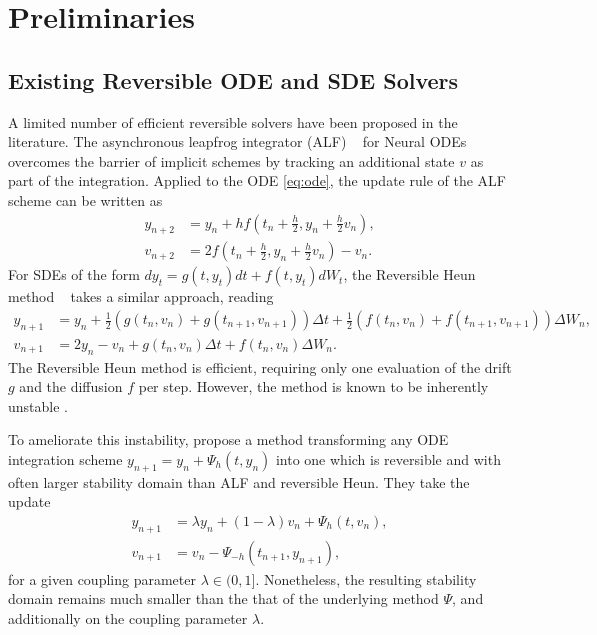 \documentclass{article}
\theoremstyle{definition}
\theoremstyle{remark}
\begin{document}
\section{Preliminaries}
\subsection{Existing Reversible ODE and SDE Solvers}
A limited number of efficient reversible solvers have been proposed in the literature. The asynchronous leapfrog integrator (ALF) ~\citep{zhuang2021mali} for Neural ODEs overcomes the barrier of implicit schemes by tracking an additional state $v$ as part of the integration. Applied to the ODE \eqref{eq:ode}, the update rule of the ALF scheme can be written as
\begin{align*}
    y_{n+2} &= y_n + h f\left(t_n + \frac{h}{2}, y_n + \frac{h}{2} v_n\right),\\
    v_{n+2} &=2f\left(t_n + \frac{h}{2}, y_n + \frac{h}{2} v_n\right) - v_n.
\end{align*}
For SDEs of the form $dy_t = g(t,y_t)dt + f(t,y_t)dW_t$, the Reversible Heun method ~\citep{kidger2021efficient} takes a similar approach, reading
\begin{align*}
    y_{n+1} &= y_n + \frac{1}{2}(g(t_n, v_n) + g(t_{n+1}, v_{n+1})) \Delta t + \frac{1}{2}(f(t_n, v_n) + f(t_{n+1}, v_{n+1})) \Delta W_n,\\
    v_{n+1} &= 2y_n - v_n + g(t_n, v_n) \Delta t + f(t_n, v_n) \Delta W_n.
\end{align*}
The Reversible Heun method is efficient, requiring only one evaluation of the drift $g$ and the diffusion $f$ per step. However, the method is known to be inherently unstable \cite[Theorem D.19]{kidger2021efficient}.

To ameliorate this instability, \citet{mccallum2024efficient} propose a method transforming any ODE integration scheme $y_{n+1} = y_n + \Psi_h(t,y_n)$ into one which is reversible and with often larger stability domain than ALF and reversible Heun. They take the update
\begin{align*}
    y_{n+1} &= \lambda y_n + (1-\lambda) v_n + \Psi_h(t,v_n),\\
    v_{n+1} &= v_n - \Psi_{-h}(t_{n+1}, y_{n+1}),
\end{align*}
for a given coupling parameter $\lambda \in (0,1]$. Nonetheless, the resulting stability domain remains much smaller than the that of the underlying method $\Psi$, and additionally on the coupling parameter $\lambda$.
\end{document}
